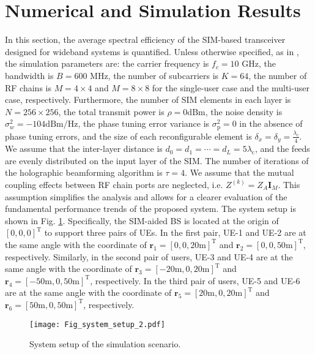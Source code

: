 \documentclass[lettersize,journal]{IEEEtran}
\theoremstyle{remark}
\begin{document}
\section{Numerical and Simulation Results}\label{Numerical_and_Simulation_Results}
In this section, the average spectral efficiency of the SIM-based transceiver designed for wideband systems is quantified. Unless otherwise specified, as in \cite{deng2022reconfigurable_twc}, \cite{cheng2024achievable} the simulation parameters are: the carrier frequency is $f_c=10$ GHz, the bandwidth is $B=600$ MHz, the number of subcarriers is $K=64$, the number of RF chains is $M=4\times4$ and $M=8\times8$ for the single-user case and the multi-user case, respectively. Furthermore, the number of SIM elements in each layer is $N=256\times256$, the total transmit power is $\rho=0\mathrm{dBm}$, the noise density is $\sigma_w^2=-104\mathrm{dBm/Hz}$, the phase tuning error variance is $\sigma_\mathrm{p}^2=0$ in the absence of phase tuning errors, and the size of each reconfigurable element is $\delta_x=\delta_y=\frac{\lambda_\mathrm{c}}{4}$. We assume that the inter-layer distance is $d_0=d_1=\cdots=d_L=5\lambda_\mathrm{c}$, and the feeds are evenly distributed on the input layer of the SIM. The number of iterations of the holographic beamforming algorithm is $\tau=4$. We assume that the mutual coupling effects between RF chain ports are neglected, i.e. $Z^{(k)}=Z_A\mathbf{I}_M$. This assumption simplifies the analysis and allows for a clearer evaluation of the fundamental performance trends of the proposed system. The system setup is shown in Fig. \ref{Fig_system_setup}. Specifically, the SIM-aided BS is located at the origin of $[0,0,0]^\mathrm{T}$ to support three pairs of UEs. In the first pair, UE-1 and UE-2 are at the same angle with the coordinate of $\mathbf{r}_1=[0,0,20\mathrm{m}]^\mathrm{T}$ and $\mathbf{r}_2=[0,0,50\mathrm{m}]^\mathrm{T}$, respectively. Similarly, in the second pair of users, UE-3 and UE-4 are at the same angle with the coordinate of $\mathbf{r}_3=[-20\mathrm{m},0,20\mathrm{m}]^\mathrm{T}$ and $\mathbf{r}_4=[-50\mathrm{m},0,50\mathrm{m}]^\mathrm{T}$, respectively. In the third pair of users, UE-5 and UE-6 are at the same angle with the coordinate of $\mathbf{r}_5=[20\mathrm{m},0,20\mathrm{m}]^\mathrm{T}$ and $\mathbf{r}_6=[50\mathrm{m},0,50\mathrm{m}]^\mathrm{T}$, respectively.

\begin{figure}[!t]
    \centering
    \texttt{[image: Fig\_system\_setup\_2.pdf]}
    \caption{System setup of the simulation scenario.}\label{Fig_system_setup}
\end{figure}
\end{document}
